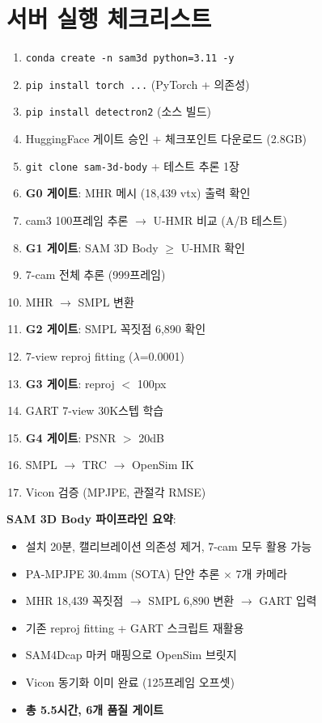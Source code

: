 \documentclass[11pt, a4paper]{report}
\begin{document}
\chapter{서버 실행 체크리스트}

\begin{checklistbox}[title={서버 접속 후 실행 순서}]
\begin{enumerate}
\item[$\square$] \texttt{conda create -n sam3d python=3.11 -y}
\item[$\square$] \texttt{pip install torch ...} (PyTorch + 의존성)
\item[$\square$] \texttt{pip install detectron2} (소스 빌드)
\item[$\square$] HuggingFace 게이트 승인 + 체크포인트 다운로드 (2.8GB)
\item[$\square$] \texttt{git clone sam-3d-body} + 테스트 추론 1장
\item[$\square$] \textbf{G0 게이트}: MHR 메시 (18,439 vtx) 출력 확인
\item[$\square$] cam3 100프레임 추론 $\to$ U-HMR 비교 (A/B 테스트)
\item[$\square$] \textbf{G1 게이트}: SAM 3D Body $\geq$ U-HMR 확인
\item[$\square$] 7-cam 전체 추론 (999프레임)
\item[$\square$] MHR $\to$ SMPL 변환
\item[$\square$] \textbf{G2 게이트}: SMPL 꼭짓점 6,890 확인
\item[$\square$] 7-view reproj fitting ($\lambda$=0.0001)
\item[$\square$] \textbf{G3 게이트}: reproj $<$ 100px
\item[$\square$] GART 7-view 30K스텝 학습
\item[$\square$] \textbf{G4 게이트}: PSNR $>$ 20dB
\item[$\square$] SMPL $\to$ TRC $\to$ OpenSim IK
\item[$\square$] Vicon 검증 (MPJPE, 관절각 RMSE)
\end{enumerate}
\end{checklistbox}

\begin{summary}
\textbf{SAM 3D Body 파이프라인 요약}:
\begin{itemize}
\item 설치 20분, 캘리브레이션 의존성 제거, 7-cam 모두 활용 가능
\item PA-MPJPE 30.4mm (SOTA) 단안 추론 $\times$ 7개 카메라
\item MHR 18,439 꼭짓점 $\to$ SMPL 6,890 변환 $\to$ GART 입력
\item 기존 reproj fitting + GART 스크립트 재활용
\item SAM4Dcap 마커 매핑으로 OpenSim 브릿지
\item Vicon 동기화 이미 완료 (125프레임 오프셋)
\item \textbf{총 5.5시간, 6개 품질 게이트}
\end{itemize}
\end{summary}
\end{document}
